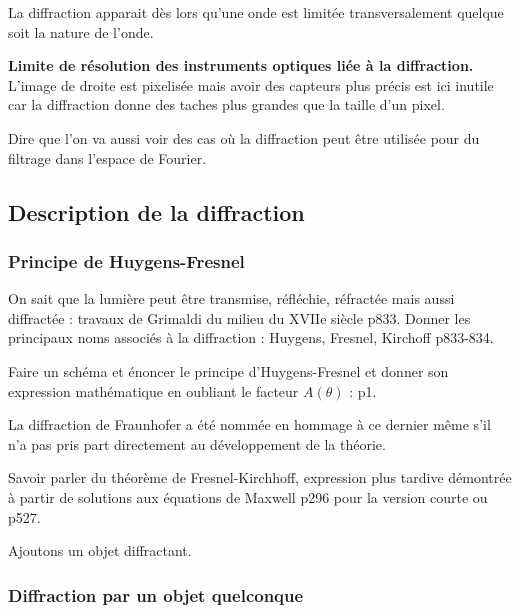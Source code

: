 La diffraction apparait dès lors qu'une onde est limitée transversalement quelque soit la nature de l'onde.

\begin{slide}
\textbf{Limite de résolution des instruments optiques liée à la diffraction.}
L'image de droite est pixelisée mais avoir des capteurs plus précis est ici inutile car la diffraction donne des taches plus grandes que la taille d'un pixel.
\end{slide}

Dire que l'on va aussi voir des cas où la diffraction peut être utilisée pour du filtrage dans l'espace de Fourier.

\subsection{Description de la diffraction}

\subsubsection{Principe de Huygens-Fresnel}

On sait que la lumière peut être transmise, réfléchie, réfractée mais aussi diffractée : travaux de Grimaldi du milieu du $\mathrm{XVIIe}$ siècle \cite{Sanz2016} p833.
Donner les principaux noms associés à la diffraction : Huygens, Fresnel, Kirchoff \cite{Sanz2016} p833-834.

Faire un schéma et énoncer le principe d'Huygens-Fresnel et donner son expression mathématique en oubliant le facteur $A(\theta)$ : \cite{Sayrin2019} p1.

\begin{remarque}
La diffraction de Fraunhofer a été nommée en hommage à ce dernier même s'il n'a pas pris part directement au développement de la théorie.

\noindent
Savoir parler du théorème de Fresnel-Kirchhoff, expression plus tardive démontrée à partir de solutions aux équations de Maxwell \cite{Fruchart2016} p296 pour la version courte ou \cite{Hecht2002} p527.
\end{remarque}

\begin{transition}
Ajoutons un objet diffractant.
\end{transition}

\subsubsection{Diffraction par un objet quelconque}

